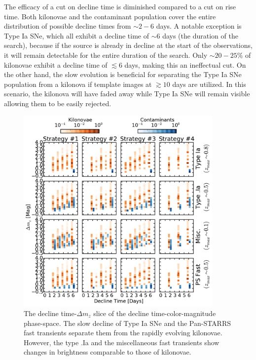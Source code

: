 The efficacy of a cut on decline time is diminished compared to a cut on rise time. Both kilonovae and the contaminant population cover the entire distribution of possible decline times from $\sim2-6$ days. A notable exception is Type Ia SNe, which all exhibit a decline time of $\sim6$ days (the duration of the search), because if the source is already in decline at the start of the observations, it will remain detectable for the entire duration of the search. Only $\sim20-25\%$ of kilonovae exhibit a decline time of $\lesssim6$ days, making this an ineffectual cut. On the other hand, the slow evolution is beneficial for separating the Type Ia SNe population from a kilonova if template images at $\gtrsim 10$ days are utilized. In this scenario, the kilonova will have faded away while Type Ia SNe will remain visible allowing them to be easily rejected.

\begin{figure}[t!]
\centering
\includegraphics[width=0.9\textwidth]{./figs/chapter2/ch2_f11.pdf}
\caption{The decline time-$\Delta m_z$ slice of the decline time-color-magnitude phase-space. The slow decline of Type Ia SNe and the Pan-STARRS fast transients separate them from the rapidly evolving kilonovae. However, the type .Ia and the miscellaneous fast transients show changes in brightness comparable to those of kilonovae.}
\label{fig:ch2_decdm}
\end{figure}

